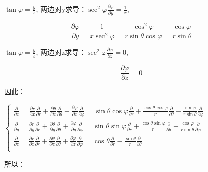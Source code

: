 $\tan \varphi  = \frac{y}{x}$, 两边对y求导：$\sec ^2 \varphi \frac{{\partial \varphi }}{{\partial y}} = \frac{1}{x}$,

\begin{equation}
\frac{{\partial \varphi }}{{\partial y}} = \frac{1}{{x\sec ^2 \varphi }} = \frac{{\cos ^2 \varphi }}{{r\sin \theta \cos \varphi }} = \frac{{\cos \varphi }}{{r\sin \theta }}
\end{equation}

$\tan \varphi  = \frac{y}{x}$, 两边对z求导：$\sec ^2 \varphi \frac{{\partial \varphi }}{{\partial z}} = 0$, 

\begin{equation}
\frac{{\partial \varphi }}{{\partial z}} = 0
\end{equation}

因此：

\begin{center}
$\left\{ \begin{array}{l}
 \frac{\partial }{{\partial x}} = \frac{{\partial r}}{{\partial x}}\frac{\partial }{{\partial r}} + \frac{{\partial \theta }}{{\partial x}}\frac{\partial }{{\partial \theta }} + \frac{{\partial \varphi }}{{\partial x}}\frac{\partial }{{\partial \varphi }} = \sin \theta \cos \varphi \frac{\partial }{{\partial r}} + \frac{{\cos \theta \cos \varphi }}{r}\frac{\partial }{{\partial \theta }} - \frac{{\sin \varphi }}{{r\sin \theta }}\frac{\partial }{{\partial \varphi }} \\
 \frac{\partial }{{\partial y}} = \frac{{\partial r}}{{\partial y}}\frac{\partial }{{\partial r}} + \frac{{\partial \theta }}{{\partial y}}\frac{\partial }{{\partial \theta }} + \frac{{\partial \varphi }}{{\partial y}}\frac{\partial }{{\partial \varphi }} = \sin \theta \sin \varphi \frac{\partial }{{\partial r}} + \frac{{\cos \theta \sin \varphi }}{r}\frac{\partial }{{\partial \theta }} + \frac{{\cos \varphi }}{{r\sin \theta }}\frac{\partial }{{\partial \varphi }} \\
 \frac{\partial }{{\partial z}} = \frac{{\partial r}}{{\partial z}}\frac{\partial }{{\partial r}} + \frac{{\partial \theta }}{{\partial z}}\frac{\partial }{{\partial \theta }} + \frac{{\partial \varphi }}{{\partial z}}\frac{\partial }{{\partial \varphi }} = \cos \theta \frac{\partial }{{\partial r}} - \frac{{\sin \theta }}{r}\frac{\partial }{{\partial \theta }} \\
 \end{array} \right.$
\end{center}

所以：

